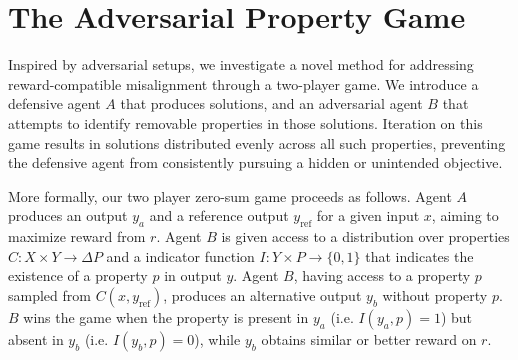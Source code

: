 \section{The Adversarial Property Game} \label{sec:adversarial_games}


Inspired by adversarial setups, we investigate a novel method for addressing reward-compatible misalignment through a two-player game. We introduce a defensive agent $A$ that produces solutions, and an adversarial agent $B$ that attempts to identify removable properties in those solutions. Iteration on this game results in solutions distributed evenly across all such properties, preventing the defensive agent from consistently pursuing a hidden or unintended objective.
 

More formally, our two player zero-sum game proceeds as follows. Agent $A$ produces an output $y_a$ and a reference output $y_\mathrm{ref}$ for a given input $x$, aiming to maximize reward from $r$. 
Agent $B$ is given access to a distribution over properties $C: X \times Y \to \Delta P$ and a indicator function $I: Y \times P \to \{0,1\}$ that indicates the existence of a property $p$ in output $y$.
Agent $B$, having access to a property $p$ sampled from $C(x,y_\mathrm{ref})$, produces an alternative output $y_b$ without property $p$. $B$ wins the game when the property is present in $y_a$ (i.e. $I(y_a,p)=1$) but absent in $y_b$ (i.e. $I(y_b,p)=0$), while $y_b$ obtains similar or better reward on $r$.



